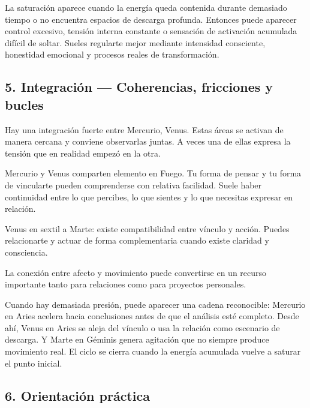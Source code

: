 \documentclass[11pt,a4paper]{article}
\begin{document}
La saturación aparece cuando la energía queda contenida durante demasiado tiempo o no encuentra espacios de descarga profunda. Entonces puede aparecer control excesivo, tensión interna constante o sensación de activación acumulada difícil de soltar. Sueles regularte mejor mediante intensidad consciente, honestidad emocional y procesos reales de transformación.

\vspace{0.8cm}

\subsection{5. Integración — Coherencias, fricciones y bucles}

\justifying
Hay una integración fuerte entre Mercurio, Venus. Estas áreas se activan de manera cercana y conviene observarlas juntas. A veces una de ellas expresa la tensión que en realidad empezó en la otra.

Mercurio y Venus comparten elemento en Fuego. Tu forma de pensar y tu forma de vincularte pueden comprenderse con relativa facilidad. Suele haber continuidad entre lo que percibes, lo que sientes y lo que necesitas expresar en relación.

Venus en sextil a Marte: existe compatibilidad entre vínculo y acción. Puedes relacionarte y actuar de forma complementaria cuando existe claridad y consciencia.

La conexión entre afecto y movimiento puede convertirse en un recurso importante tanto para relaciones como para proyectos personales.

Cuando hay demasiada presión, puede aparecer una cadena reconocible: Mercurio en Aries acelera hacia conclusiones antes de que el análisis esté completo. Desde ahí, Venus en Aries se aleja del vínculo o usa la relación como escenario de descarga. Y Marte en Géminis genera agitación que no siempre produce movimiento real. El ciclo se cierra cuando la energía acumulada vuelve a saturar el punto inicial.

\vspace{0.8cm}

\subsection{6. Orientación práctica}
\end{document}

